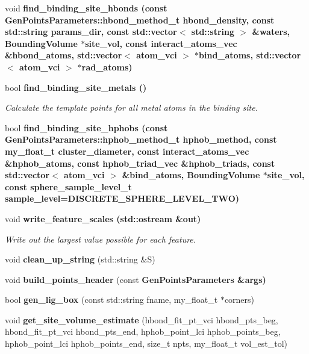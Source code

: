 \begin{CompactItemize}
\item 
void \bf{find\_\-binding\_\-site\_\-hbonds} (const \bf{Gen\-Points\-Parameters::hbond\_\-method\_\-t} hbond\_\-density, const std::string params\_\-dir, const std::vector$<$ std::string $>$ \&waters, \bf{Bounding\-Volume} $\ast$site\_\-vol, const interact\_\-atoms\_\-vec \&hbond\_\-atoms, std::vector$<$ atom\_\-vci $>$ $\ast$bind\_\-atoms, std::vector$<$ atom\_\-vci $>$ $\ast$rad\_\-atoms)
\item 
bool \bf{find\_\-binding\_\-site\_\-metals} ()\label{classSimSite3D_1_1Sitemap_4fcf9aa2c2a4afcf1d21bd3038434d7d}

\begin{CompactList}\small\item\em Calculate the template points for all metal atoms in the binding site. \item\end{CompactList}\item 
bool \bf{find\_\-binding\_\-site\_\-hphobs} (const \bf{Gen\-Points\-Parameters::hphob\_\-method\_\-t} hphob\_\-method, const my\_\-float\_\-t cluster\_\-diameter, const interact\_\-atoms\_\-vec \&hphob\_\-atoms, const hphob\_\-triad\_\-vec \&hphob\_\-triads, const std::vector$<$ atom\_\-vci $>$ \&bind\_\-atoms, \bf{Bounding\-Volume} $\ast$site\_\-vol, const sphere\_\-sample\_\-level\_\-t sample\_\-level=DISCRETE\_\-SPHERE\_\-LEVEL\_\-TWO)
\item 
void \bf{write\_\-feature\_\-scales} (std::ostream \&out)\label{classSimSite3D_1_1Sitemap_1596bc4cf18ba4f6709a67f3e30437cb}

\begin{CompactList}\small\item\em Write out the largest value possible for each feature. \item\end{CompactList}\item 
void \textbf{clean\_\-up\_\-string} (std::string \&S)\label{classSimSite3D_1_1Sitemap_0894845a3e513c909d694bbd0fdcaba3}

\item 
void \textbf{build\_\-points\_\-header} (const \bf{Gen\-Points\-Parameters} \&args)\label{classSimSite3D_1_1Sitemap_2f3a6d65a3e920903d9d4869c168510d}

\item 
bool \textbf{gen\_\-lig\_\-box} (const std::string fname, my\_\-float\_\-t $\ast$corners)\label{classSimSite3D_1_1Sitemap_583a1a32407f665be875abee7e6744d2}

\item 
void \textbf{get\_\-site\_\-volume\_\-estimate} (hbond\_\-fit\_\-pt\_\-vci hbond\_\-pts\_\-beg, hbond\_\-fit\_\-pt\_\-vci hbond\_\-pts\_\-end, hphob\_\-point\_\-lci hphob\_\-points\_\-beg, hphob\_\-point\_\-lci hphob\_\-points\_\-end, size\_\-t npts, my\_\-float\_\-t vol\_\-est\_\-tol)\label{classSimSite3D_1_1Sitemap_6fc2cf350f7c9dbe24ef402196d601d5}


\end{CompactItemize}
